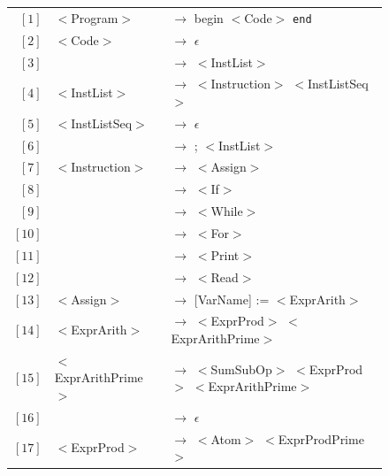 \documentclass[letterpaper]{article}
\begin{document}
\begin{figure}
    \begin{center}
            \begin{tabular}{r l l}
                $[1]$ & $<$Program$>$ & $\rightarrow$ begin $<$Code$>$
                \texttt{end} \\

                $[2]$ & $<$Code$>$ & $\rightarrow$ $\epsilon$ \\
                $[3]$ &            & $\rightarrow$ $<$InstList$>$ \\

                $[4]$ & $<$InstList$>$ & $\rightarrow$ $<$Instruction$>$
                $<$InstListSeq$>$ \\

                $[5]$ & $<$InstListSeq$>$ & $\rightarrow$ $\epsilon$ \\
                $[6]$ &                   & $\rightarrow$ ; $<$InstList$>$ \\

                $[7]$ & $<$Instruction$>$ & $\rightarrow$ $<$Assign$>$ \\
                $[8]$ &                   & $\rightarrow$ $<$If$>$ \\
                $[9]$ &                   & $\rightarrow$ $<$While$>$ \\
                $[10]$ &                   & $\rightarrow$ $<$For$>$ \\
                $[11]$ &                   & $\rightarrow$ $<$Print$>$ \\
                $[12]$ &                   & $\rightarrow$ $<$Read$>$ \\

                $[13]$ & $<$Assign$>$ & $\rightarrow$
                 [VarName] := $<$ExprArith$>$  \\

                $[14]$ & $<$ExprArith$>$ & $\rightarrow$
                $<$ExprProd$>$ $<$ExprArithPrime$>$ \\

                $[15]$ & $<$ExprArithPrime$>$ & $\rightarrow$
                $<$SumSubOp$>$ $<$ExprProd$>$ $<$ExprArithPrime$>$ \\
                $[16]$ & & $\rightarrow$ $\epsilon$ \\

                $[17]$ & $<$ExprProd$>$ & $\rightarrow$
                $<$Atom$>$ $<$ExprProdPrime$>$ \\


\end{tabular}
\end{center}
\end{figure}
\end{document}
